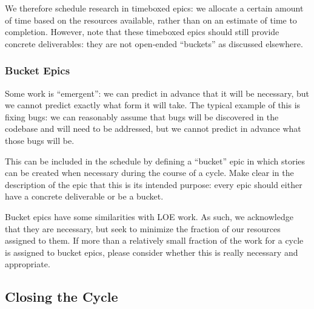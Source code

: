 We therefore schedule research in \gls{timebox}ed \glspl{epic}: we allocate a certain amount of time based on the resources available, rather than on an estimate of time to completion.
However, note that these \gls{timebox}ed \glspl{epic} should still provide concrete deliverables: they are not open-ended ``buckets'' as discussed elsewhere.

\subsubsection{Bucket Epics} \label{sec:bucket}

Some work is ``emergent'': we can predict in advance that it will be necessary, but we cannot predict exactly what form it will take.
The typical example of this is fixing bugs: we can reasonably assume that bugs will be discovered in the codebase and will need to be addressed, but we cannot predict in advance what those bugs will be.

This can be included in the schedule by defining a ``bucket'' \gls{epic} in which stories can be created when necessary during the course of a \gls{cycle}.
Make clear in the description of the \gls{epic} that this is its intended purpose: every \gls{epic} should either have a concrete deliverable or be a bucket.

Bucket \glspl{epic} have some similarities with \gls{LOE} work.
As such, we acknowledge that they are necessary, but seek to minimize the fraction of our resources assigned to them.
If more than a relatively small fraction of the work for a \gls{cycle} is assigned to bucket \glspl{epic}, please consider whether this is really necessary and appropriate.



\subsection{Closing the Cycle} \label{sec:cycle-close}

